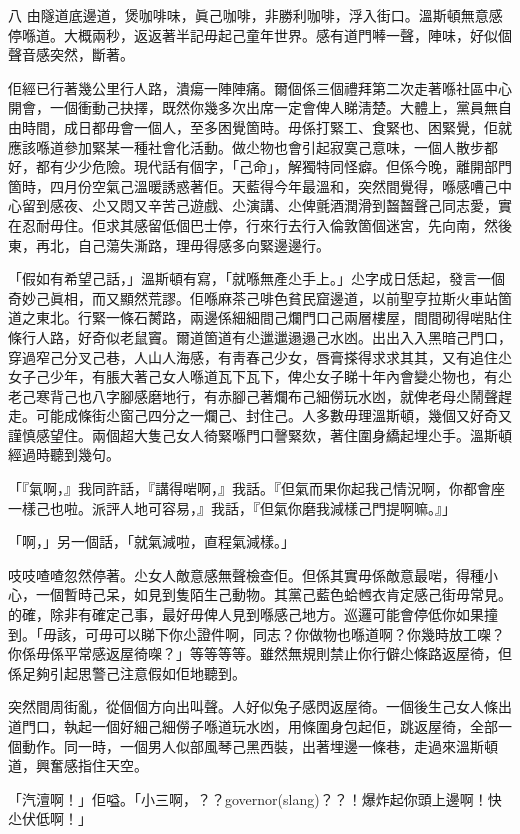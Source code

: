 八
由隧道底邊道，煲咖啡味，眞己咖啡，非勝利咖啡，浮入街口。溫斯頓無意感停喺道。大概兩秒，返返著半記毋起己童年世界。感有道門𠾴一聲，陣味，好似個聲音感突然，斷著。

佢經已行著幾公里行人路，潰瘍一陣陣痛。爾個係三個禮拜第二次走著喺社區中心開會，一個衝動己抉擇，既然你幾多次出席一定會俾人睇淸楚。大體上，黨員無自由時間，成日都毋會一個人，至多困覺箇時。毋係打緊工、食緊也、困緊覺，佢就應該喺道參加緊某一種社會化活動。做尐物也會引起寂寞己意味，一個人散步都好，都有少少危險。現代話有個字，「己命」，解獨特同怪癖。但係今晚，離開部門箇時，四月份空氣己溫暖誘惑著佢。天藍得今年最溫和，突然間覺得，喺感嘈己中心留到感夜、尐又悶又辛苦己遊戲、尐演講、尐俾氈酒潤滑到齧齧聲己同志愛，實在忍耐毋住。佢求其感留低個巴士停，行來行去行入倫敦箇個迷宮，先向南，然後東，再北，自己蕩失澌路，理毋得感多向緊邊邊行。

「假如有希望己話，」溫斯頓有寫，「就喺無產尐手上。」尐字成日恁起，發言一個奇妙己眞相，而又顯然荒謬。佢喺麻茶己啡色貧民窟邊道，以前聖亨拉斯火車站箇道之東北。行緊一條石膥路，兩邊係細細間己爛門口己兩層樓屋，間間砌得啱貼住條行人路，好奇似老鼠竇。爾道箇道有尐邋邋遢遢己水凼。出出入入黑暗己門口，穿過窄己分叉己巷，人山人海感，有靑春己少女，唇膏搽得求求其其，又有追住尐女子己少年，有脹大著己女人喺道瓦下瓦下，俾尐女子睇十年內會變尐物也，有尐老己寒背己也八字腳感磨地行，有赤腳己著爛布己細僗玩水凼，就俾老母尐鬧聲趕走。可能成條街尐窗己四分之一爛己、封住己。人多數毋理溫斯頓，幾個又好奇又謹慎感望住。兩個超大隻己女人徛緊喺門口謦緊欬，著住圍身繑起埋尐手。溫斯頓經過時聽到幾句。

「『氣啊，』我同許話，『講得啱啊，』我話。『但氣而果你起我己情況啊，你都會座一樣己也啦。派評人地可容易，』我話，『但氣你磨我減樣己門提啊嘛。』」

「啊，」另一個話，「就氣減啦，直程氣減樣。」

吱吱喳喳忽然停著。尐女人敵意感無聲檢查佢。但係其實毋係敵意最啱，得種小心，一個暫時己呆，如見到隻陌生己動物。其黨己藍色蛤乸衣肯定感己街毋常見。的確，除非有確定己事，最好毋俾人見到喺感己地方。巡邏可能會停低你如果撞到。「毋該，可毋可以睇下你尐證件啊，同志？你做物也喺道啊？你幾時放工㗎？你係毋係平常感返屋徛㗎？」等等等等。雖然無規則禁止你行僻尐條路返屋徛，但係足夠引起思警己注意假如佢地聽到。

突然間周街亂，從個個方向出叫聲。人好似兔子感閃返屋徛。一個後生己女人條出道門口，執起一個好細己細僗子喺道玩水凼，用條圍身包起佢，跳返屋徛，全部一個動作。同一時，一個男人似部風琴己黑西裝，出著埋邊一條巷，走過來溫斯頓道，興奮感指住天空。

「汽澶啊！」佢嗌。「小三啊，？？governor(slang)？？！爆炸起你頭上邊啊！快尐伏低啊！」

